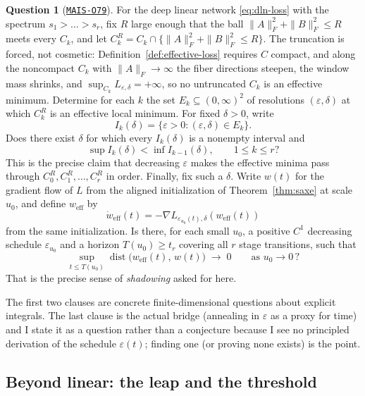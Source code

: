 \documentclass[11pt]{amsart}
\newcommand{\Oid}[1]{\href{https://github.com/lionellevine/MAIS/blob/main/open-problems/MAIS-O#1.md}{\texttt{MAIS-O#1}}}
\theoremstyle{plain}
\theoremstyle{definition}
\newtheorem{question}[theorem]{Question}
\newcommand{\dist}{\operatorname{dist}}
\begin{document}
\begin{question}[\Oid{79}]\label{q:effective-loss}
For the deep linear network \eqref{eq:dln-loss} with the spectrum $s_1 > \dots > s_r$, fix $R$ large enough that the ball $\| A \|_F^2 + \| B \|_F^2 \le R$ meets every $C_k$, and let $C_k^R = C_k \cap \{ \| A \|_F^2 + \| B \|_F^2 \le R \}$. The truncation is forced, not cosmetic: Definition~\ref{def:effective-loss} requires $C$ compact, and along the noncompact $C_k$ with $\| A \|_F \to \infty$ the fiber directions steepen, the window mass shrinks, and $\sup_{C_k} L_{\varepsilon,\delta} = +\infty$, so no untruncated $C_k$ is an effective minimum. Determine for each $k$ the set $E_k \subseteq (0,\infty)^2$ of resolutions $(\varepsilon, \delta)$ at which $C_k^R$ is an effective local minimum. For fixed $\delta>0$, write
\[
   I_k(\delta)=\{\varepsilon>0:(\varepsilon,\delta)\in E_k\}.
\]
Does there exist $\delta$ for which every $I_k(\delta)$ is a nonempty interval and
\[
   \sup I_k(\delta)<\inf I_{k-1}(\delta),
   \qquad 1\le k\le r?
\]
This is the precise claim that decreasing $\varepsilon$ makes the effective minima pass through $C_0^R,C_1^R,\dots,C_r^R$ in order. Finally, fix such a $\delta$. Write $w(t)$ for the gradient flow of $L$ from the aligned initialization of Theorem~\ref{thm:saxe} at scale $u_0$, and define $w_{\mathrm{eff}}$ by
\[
   \dot w_{\mathrm{eff}}(t)
   =-\nabla L_{\varepsilon_{u_0}(t),\delta}(w_{\mathrm{eff}}(t))
\]
from the same initialization. Is there, for each small $u_0$, a positive $C^1$ decreasing schedule $\varepsilon_{u_0}$ and a horizon $T(u_0)\ge t_r$ covering all $r$ stage transitions, such that
\[
   \sup_{t \le T(u_0)} \dist\bigl( w_{\mathrm{eff}}(t), \, w(t) \bigr) \;\to\; 0 \qquad \text{as } u_0 \to 0 \, ?
\]
That is the precise sense of \emph{shadowing} asked for here.
\end{question}

The first two clauses are concrete finite-dimensional questions about explicit integrals. The last clause is the actual bridge (annealing in $\varepsilon$ as a proxy for time) and I state it as a question rather than a conjecture because I see no principled derivation of the schedule $\varepsilon(t)$; finding one (or proving none exists) is the point.

\subsection{Beyond linear: the leap and the threshold}\label{sec:leap}
\end{document}
